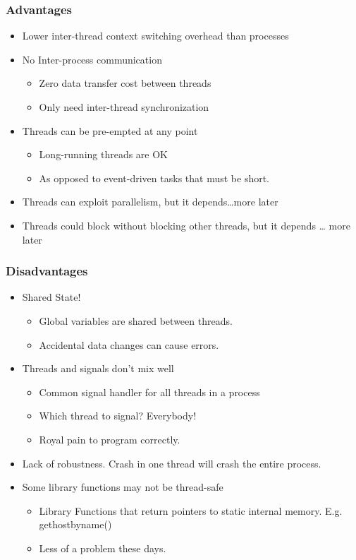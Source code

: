 \documentclass[12pt]{article}
\begin{document}
\subsubsection{Advantages}
\begin{itemize}
    \item Lower inter-thread context switching overhead than processes 
    \item No Inter-process communication \begin{itemize}
        \item Zero data transfer cost between threads 
        \item Only need inter-thread synchronization 
    \end{itemize}
    \item Threads can be pre-empted at any point \begin{itemize}
        \item Long-running threads are OK 
        \item As opposed to event-driven tasks that must be short. 
    \end{itemize}
    \item Threads can exploit parallelism, but it depends…more later 
    \item Threads could block without blocking other threads, but it depends … more later 
\end{itemize}
\subsubsection{Disadvantages}
\begin{itemize}
    \item Shared State! \begin{itemize}
        \item Global variables are shared between threads. 
        \item Accidental data changes can cause errors. 
    \end{itemize}
    \item Threads and signals don’t mix well \begin{itemize}
        \item Common signal handler for all threads in a process 
        \item Which thread to signal? Everybody! 
        \item Royal pain to program correctly. 
    \end{itemize}
    \item Lack of robustness. Crash in one thread will crash the entire process. 
    \item Some library functions may not be thread-safe \begin{itemize}
        \item Library Functions that return pointers to static internal memory. E.g. gethostbyname() 
        \item Less of a problem these days.
    \end{itemize}
\end{itemize}
\end{document}
